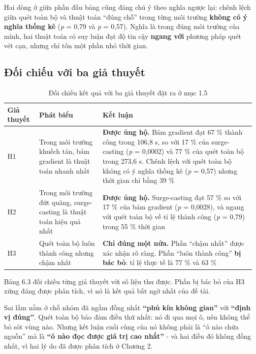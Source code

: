 Hai dòng ở giữa phần đầu bảng cũng đáng chú ý theo nghĩa ngược lại: chênh lệch giữa quét toàn bộ và thuật toán ``đúng chỗ'' trong từng môi trường \textbf{không có ý nghĩa thống kê} (\textit{p} = 0,79 và \textit{p} = 0,57). Nghĩa là trong đúng môi trường của mình, hai thuật toán có suy luận đạt độ tin cậy \textbf{ngang với} phương pháp quét vét cạn, nhưng chỉ tốn một phần nhỏ thời gian.


\subsection{Đối chiếu với ba giả thuyết}
\begin{table}[!htbp]
  \centering
  \caption{Đối chiếu kết quả với ba giả thuyết đặt ra ở mục 1.5}
  \small
  \renewcommand{\arraystretch}{1.25}
  \begin{tabular}{>{\raggedright\arraybackslash}p{}>{\raggedright\arraybackslash}p{}>{\raggedright\arraybackslash}p{}}
    \toprule
    \textbf{Giả thuyết} & \textbf{Phát biểu} & \textbf{Kết luận} \\
    \midrule
    H1 & Trong môi trường khuếch tán, bám gradient là thuật toán nhanh nhất & \textbf{Được ủng hộ.} Bám gradient đạt 67 \% thành công trong 106,8 s, so với 17 \% của surge-casting (\textit{p} = 0,0002) và 77 \% của quét toàn bộ trong 273,6 s. Chênh lệch với quét toàn bộ không có ý nghĩa thống kê (\textit{p} = 0,57) nhưng thời gian chỉ bằng 39 \% \\
    H2 & Trong môi trường đứt quãng, surge-casting là thuật toán hiệu quả nhất & \textbf{Được ủng hộ.} Surge-casting đạt 57 \% so với 17 \% của bám gradient (\textit{p} = 0,0028), và ngang với quét toàn bộ về tỉ lệ thành công (\textit{p} = 0,79) trong 55 \% thời gian \\
    H3 & Quét toàn bộ luôn thành công nhưng chậm nhất & \textbf{Chỉ đúng một nửa.} Phần ``chậm nhất'' được xác nhận rõ ràng. Phần ``luôn thành công'' \textbf{bị bác bỏ}: tỉ lệ thực tế là 77 \% và 63 \% \\
    \bottomrule
  \end{tabular}
\end{table}
Bảng 6.3 đối chiếu từng giả thuyết với số liệu thu được. Phần bị bác bỏ của H3 xứng đáng được phân tích, vì nó là kết quả bất ngờ nhất của đề tài.

Sai lầm nằm ở chỗ nhóm đã ngầm đồng nhất \textbf{``phủ kín không gian''} với \textbf{``định vị đúng''}. Quét toàn bộ bảo đảm điều thứ nhất: nó đi qua mọi ô, nên không thể bỏ sót vùng nào. Nhưng kết luận cuối cùng của nó không phải là ``ô nào chứa nguồn'' mà là \textbf{``ô nào đọc được giá trị cao nhất''} - và hai điều đó không đồng nhất, vì hai lý do đã được phân tích ở Chương 2.

